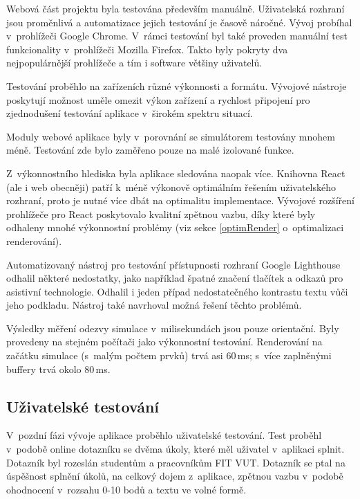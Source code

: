 Webová část projektu byla testována především manuálně.
Uživatelská rozhraní jsou proměnlivá a automatizace jejich testování je časově náročné.
Vývoj probíhal v~prohlížeči Google Chrome.
V~rámci testování byl také proveden manuální test funkcionality v~prohlížeči Mozilla Firefox.
Takto byly pokryty dva nejpopulárnější prohlížeče a tím i software většiny uživatelů.

Testování proběhlo na zařízeních různé výkonnosti a formátu.
Vývojové nástroje poskytují možnost uměle omezit výkon zařízení a rychlost připojení pro zjednodušení testování aplikace v~širokém spektru situací.

Moduly webové aplikace byly v~porovnání se simulátorem testovány mnohem méně.
Testování zde bylo zaměřeno pouze na malé izolované funkce.

Z~výkonnostního hlediska byla aplikace sledována naopak více.
Knihovna React (ale i web obecněji) patří k~méně výkonově optimálním řešením uživatelského rozhraní, proto je nutné více dbát na optimalitu implementace.
Vývojové rozšíření prohlížeče pro React poskytovalo kvalitní zpětnou vazbu, díky které byly odhaleny mnohé výkonnostní problémy (viz sekce \ref{optimRender} o~optimalizaci renderování).



Automatizovaný nástroj pro testování přístupnosti rozhraní Google Lighthouse odhalil některé nedostatky, jako například špatné značení tlačítek a odkazů pro asistivní technologie.
Odhalil i jeden případ nedostatečného kontrastu textu vůči jeho podkladu.
Nástroj také navrhoval možná řešení těchto problémů.

Výsledky měření odezvy simulace v~milisekundách jsou pouze orientační.
Byly provedeny na stejném počítači jako výkonnostní testování.
Renderování na začátku simulace (s~malým počtem prvků) trvá asi 60\,ms; s~více zaplněnými buffery trvá okolo 80\,ms.


\subsection{Uživatelské testování}

V~pozdní fázi vývoje aplikace proběhlo uživatelské testování.
Test proběhl v~podobě online dotazníku se dvěma úkoly, které měl uživatel v~aplikaci splnit.
Dotazník byl rozeslán studentům a pracovníkům FIT VUT.
Dotazník se ptal na úspěšnost splnění úkolů, na celkový dojem z~aplikace, zpětnou vazbu v~podobě ohodnocení v~rozsahu 0-10 bodů a textu ve volné formě.

